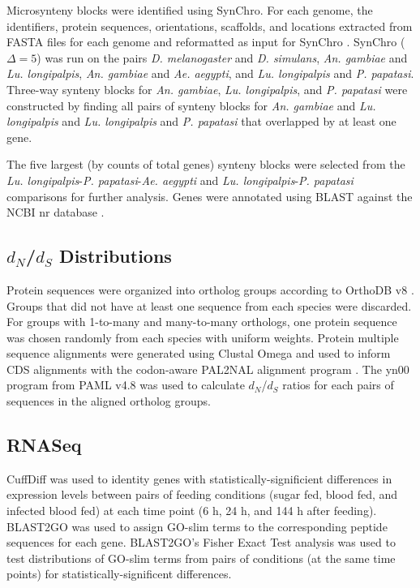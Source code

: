 Microsynteny blocks were identified using SynChro. For each genome, the identifiers, protein sequences, orientations, scaffolds, and locations extracted from FASTA files for each genome and reformatted as input for SynChro \cite{Drillon2014}.  SynChro ($\Delta=5$) was run on the pairs \emph{D. melanogaster} and \emph{D. simulans}, \emph{An. gambiae} and \emph{Lu. longipalpis}, \emph{An. gambiae} and \emph{Ae. aegypti}, and \emph{Lu. longipalpis} and \emph{P. papatasi}.  Three-way synteny blocks for \emph{An. gambiae}, \emph{Lu. longipalpis}, and \emph{P. papatasi} were constructed by finding all pairs of synteny blocks for \emph{An. gambiae} and \emph{Lu. longipalpis} and \emph{Lu. longipalpis} and \emph{P. papatasi} that overlapped by at least one gene.  

The five largest (by counts of total genes) synteny blocks were selected from the \emph{Lu. longipalpis}-\emph{P. papatasi}-\emph{Ae. aegypti} and \emph{Lu. longipalpis}-\emph{P. papatasi} comparisons for further analysis.  Genes were annotated using BLAST against the NCBI nr database \cite{Pruitt2007}.

\subsection{$d_N$/$d_S$ Distributions}
Protein sequences were organized into ortholog groups according to OrthoDB v8 \cite{Kriventseva2015}. Groups that did not have at least one sequence from each species were discarded.  For groups with 1-to-many and many-to-many orthologs, one protein sequence was chosen randomly from each species with uniform weights. Protein multiple sequence alignments were generated using Clustal Omega \cite{Sievers2011} and used to inform CDS alignments with the codon-aware PAL2NAL alignment program \cite{Suyama2006}.  The yn00 program from PAML v4.8 \cite{Yang2007} was used to calculate $d_N$/$d_S$ ratios for each pairs of sequences in the aligned ortholog groups.

\subsection{RNASeq}
CuffDiff \cite{Trapnell2010} was used to identity genes with statistically-significient differences in expression levels between pairs of feeding conditions (sugar fed, blood fed, and infected blood fed) at each time point (6 h, 24 h, and 144 h after feeding).  BLAST2GO \cite{Conesa2005,Gotz2008} was used to assign GO-slim terms \cite{Consortium2004} to the corresponding peptide sequences for each gene. BLAST2GO's Fisher Exact Test analysis was used to test distributions of GO-slim terms from pairs of conditions (at the same time points) for statistically-significent differences.

